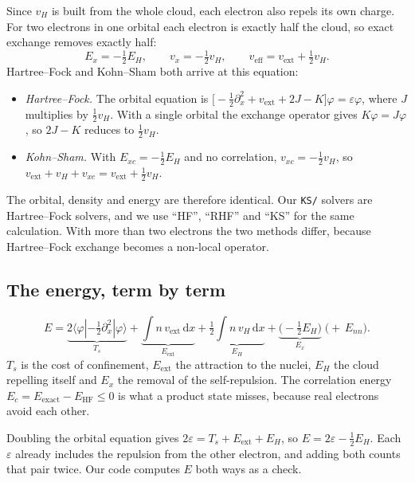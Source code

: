 \documentclass[11pt,a4paper]{article}
\newcommand{\dd}{\,\mathrm{d}}
\begin{document}
Since $v_H$ is built from the whole cloud, each electron also repels its own charge. For two electrons in one
orbital each electron is exactly half the cloud, so exact exchange removes exactly half:
\begin{equation}
  E_x=-\tfrac12E_H,\qquad v_x=-\tfrac12v_H,\qquad v_\text{eff}=v_\text{ext}+\tfrac12v_H.
\end{equation}
Hartree--Fock and Kohn--Sham both arrive at this equation:
\begin{itemize}
  \item \emph{Hartree--Fock.} The orbital equation is $\big[-\tfrac12\partial_x^2+v_\text{ext}+2J-K\big]\varphi=\varepsilon\varphi$, where $J$
        multiplies by $\tfrac12v_H$. With a single orbital the exchange operator gives $K\varphi=J\varphi$, so $2J-K$ reduces
        to $\tfrac12v_H$.
  \item \emph{Kohn--Sham.} With $E_{xc}=-\tfrac12E_H$ and no correlation, $v_{xc}=-\tfrac12v_H$, so $v_\text{ext}+v_H+v_{xc}=v_\text{ext}+\tfrac12v_H$.
\end{itemize}
The orbital, density and energy are therefore identical. Our \texttt{KS/} solvers are Hartree--Fock solvers, and we
use ``HF'', ``RHF'' and ``KS'' for the same calculation. With more than two electrons the two methods differ,
because Hartree--Fock exchange becomes a non-local operator.

\subsection{The energy, term by term}

\begin{equation}
  E=\underbrace{2\langle\varphi|-\tfrac12\partial_x^2|\varphi\rangle}_{T_s}
   +\underbrace{\int n\,v_\text{ext}\dd x}_{E_\text{ext}}
   +\underbrace{\tfrac12\int n\,v_H\dd x}_{E_H}
   +\underbrace{\big(-\tfrac12E_H\big)}_{E_x}
   \;\big(+\,E_{nn}\big).
\end{equation}
$T_s$ is the cost of confinement, $E_\text{ext}$ the attraction to the nuclei, $E_H$ the cloud repelling itself and $E_x$
the removal of the self-repulsion. The correlation energy $E_c=E_\text{exact}-E_\text{HF}\le0$ is what a product state misses, because
real electrons avoid each other.

Doubling the orbital equation gives $2\varepsilon=T_s+E_\text{ext}+E_H$, so $E=2\varepsilon-\tfrac12E_H$. Each $\varepsilon$ already includes the
repulsion from the other electron, and adding both counts that pair twice. Our code computes $E$ both ways as
a check.
\end{document}
